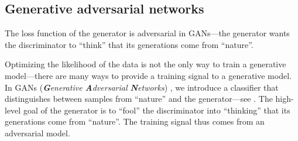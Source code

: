 \subsection{Generative adversarial networks}

\begin{marginfigure}
    \centering
    \caption{The loss function of the generator is adversarial in GANs---the generator wants the discriminator to ``think'' that its generations come from ``nature''.}
    \label{fig:adversarial}
\end{marginfigure}

Optimizing the likelihood of the data is not the only way to train a generative model---there are
many ways to provide a training signal to a generative model. In GANs (\textit{\textbf{G}enerative
    \textbf{A}dversarial \textbf{N}etworks}) \citep{goodfellow2020generative}, we introduce a
classifier that distinguishes between samples from ``nature'' and the generator---see
. The high-level goal of the generator is to ``fool'' the discriminator into
``thinking'' that its generations come from ``nature''. The training signal thus comes from an
adversarial model.

